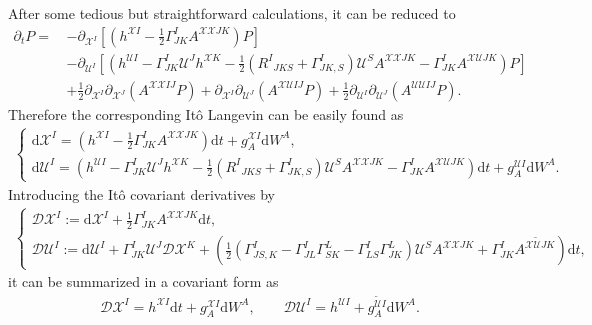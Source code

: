 \documentclass[aps, prd
, preprint
, nofootinbib 
, longbibliography
]{revtex4-1}
\newcommand{\dd}{\mathrm{d}}
\newcommand{\dps}{\displaystyle}
\newcommand{\calD}{\mathcal{D}}
\newcommand{\calU}{\mathcal{U}}
\newcommand{\calX}{\mathcal{X}}
\newcommand{\bae}[1]{\begin{align} #1 \end{align}}
\newcommand{\bce}[1]{\begin{cases} #1 \end{cases}}
\begin{document}
After some tedious but straightforward calculations, it can be reduced to
\bae{
    \partial_tP=\,&-\partial_{\calX^I}\left[\left(h^{\calX I}-\frac{1}{2}\Gamma^I_{JK}A^{\calX\calX JK}\right)P\right] \nonumber \\
    &-\partial_{\calU^I}\left[\left(h^{\calU I}-\Gamma^I_{JK}\calU^Jh^{\calX K}-\frac{1}{2}(R^I{}_{JKS}+\Gamma^I_{JK,S})\calU^SA^{\calX\calX JK}-\Gamma^I_{JK}A^{\calX\calU JK}\right)P\right] \nonumber \\
    &+\frac{1}{2}\partial_{\calX^I}\partial_{\calX^J}(A^{\calX\calX IJ}P)+\partial_{\calX^I}\partial_{\calU^J}(A^{\calX\calU IJ}P)+\frac{1}{2}\partial_{\calU^I}\partial_{\calU^J}(A^{\calU\calU IJ}P).
}
Therefore the corresponding It\^o Langevin can be easily found as
\bae{
    \bce{
        \dps
        \dd \calX^I=\left(h^{\calX I}-\frac{1}{2}\Gamma^I_{JK}A^{\calX\calX JK}\right)\dd t+g^{\calX I}_A\dd W^A, \\
        \dps
        \dd \calU^I=\left(h^{\calU I}-\Gamma^I_{JK}\calU^Jh^{\calX K}-\frac{1}{2}(R^I{}_{JKS}+\Gamma^I_{JK,S})\calU^SA^{\calX\calX JK}-\Gamma^I_{JK}A^{\calX\calU JK}\right)\dd t+g^{\calU I}_A\dd W^A.
    }
}
Introducing the It\^o covariant derivatives by
\bae{\label{eq: Ito deriavtive for tangent bundle}
    \bce{
        \dps
        \calD\calX^I:=\dd\calX^I+\frac{1}{2}\Gamma^I_{JK}A^{\calX\calX JK}\dd t, \\
        \dps
        \calD\calU^I:=\dd\calU^I+\Gamma^I_{JK}\calU^J\calD\calX^K+\left(\frac{1}{2}(\Gamma^I_{JS,K}-\Gamma^I_{JL}\Gamma^L_{SK}-\Gamma^I_{LS}\Gamma^L_{JK})\calU^SA^{\calX\calX JK}+\Gamma^I_{JK}A^{\calX\tilde{\calU}JK}\right)\dd t,
    }
}
it can be summarized in a covariant form as
\bae{
    \calD\calX^I=h^{\calX I}\dd t+g^{\calX I}_A\dd W^A, \qquad \calD\calU^I=h^{\calU I}+g^{\tilde{\calU}I}_A\dd W^A.
}
\end{document}
